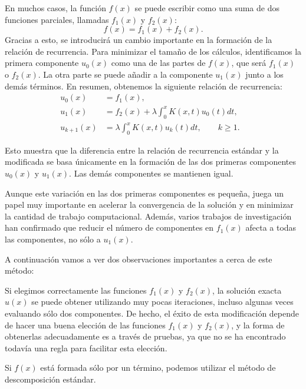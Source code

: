 En muchos casos, la función $f(x)$ se puede escribir como una suma de dos funciones parciales, llamadas $f_1(x)$ y $f_2(x)$:
\begin{equation}
	f(x) = f_1(x) + f_2(x).
\end{equation}
Gracias a esto, se introducirá un cambio importante en la formación de la relación de recurrencia. Para minimizar el tamaño de los cálculos, identificamos la primera componente $u_0(x)$ como una de las partes de $f(x)$, que será $f_1(x)$ o $f_2(x)$. La otra parte se puede añadir a la componente $u_1(x)$ junto a los demás términos. En resumen, obtenemos la siguiente relación de recurrencia:
\begin{align}
	u_0(x) &= f_1(x),      &   \\
	u_{1}(x) &= f_2(x) + \lambda \int_{0}^{x} K(x,t)u_0(t)dt,    &  \\
	u_{k+1}(x) &= \lambda \int_{0}^{x} K(x,t)u_k(t)dt, \qquad k \geqslant 1.    &
\end{align}	
\begin{observacion}
	Esto muestra que la diferencia entre la relación de recurrencia estándar y la modificada se basa únicamente en la formación de las dos primeras componentes $u_0(x)$ y $u_1(x)$. Las demás componentes se mantienen igual.
\end{observacion}
Aunque este variación en las dos primeras componentes es pequeña, juega un papel muy importante en acelerar la convergencia de la solución y en minimizar la cantidad de trabajo computacional. Además, varios trabajos de investigación han confirmado que reducir el número de componentes en $f_1(x)$ afecta a todas las componentes, no sólo a $u_1(x)$.

A continuación vamos a ver dos observaciones importantes a cerca de este método:
\begin{observacion}
	Si elegimos correctamente las funciones $f_1(x)$ y $f_2(x)$, la solución exacta $u(x)$ se puede obtener utilizando muy pocas iteraciones, incluso algunas veces evaluando sólo dos componentes. De hecho, el éxito de esta modificación depende de hacer una buena elección de las funciones $f_1(x)$ y $f_2(x)$, y la forma de obtenerlas adecuadamente es a través de pruebas, ya que no se ha encontrado todavía una regla para facilitar esta elección.
\end{observacion}

\begin{observacion}
	Si $f(x)$ está formada sólo por un término, podemos utilizar el método de descomposición estándar.
\end{observacion}

